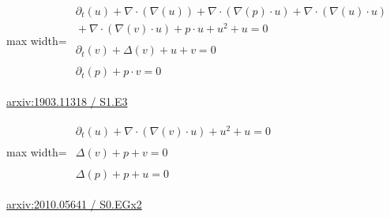 \documentclass[UTF8,10pt,a4paper,fontset=mac]{ctexart}
\begin{document}
\begin{minipage}{\linewidth}\begin{center}\begin{adjustbox}{max width=\linewidth}$\displaystyle\begin{gathered}\begin{gathered}\partial_{t}(u)+\nabla\cdot(\nabla(u))+\nabla\cdot(\nabla(p)\cdot u)+\nabla\cdot(\nabla(u)\cdot u)\\[-1pt]{}+\nabla\cdot(\nabla(v)\cdot u)+p\cdot u+u^{2}+u=0\end{gathered}\\[5pt]\begin{gathered}\partial_{t}(v)+\Delta(v)+u+v=0\end{gathered}\\[5pt]\begin{gathered}\partial_{t}(p)+p\cdot v=0\end{gathered}\end{gathered}$\end{adjustbox}\end{center}{\small\href{https://arxiv.org/html/1903.11318#S1.E3}{arxiv:1903.11318 / S1.E3}}\par\end{minipage}\par\vspace{6mm}

\begin{minipage}{\linewidth}\begin{center}\begin{adjustbox}{max width=\linewidth}$\displaystyle\begin{gathered}\begin{gathered}\partial_{t}(u)+\nabla\cdot(\nabla(v)\cdot u)+u^{2}+u=0\end{gathered}\\[5pt]\begin{gathered}\Delta(v)+p+v=0\end{gathered}\\[5pt]\begin{gathered}\Delta(p)+p+u=0\end{gathered}\end{gathered}$\end{adjustbox}\end{center}{\small\href{https://arxiv.org/html/2010.05641#S0.EGx2}{arxiv:2010.05641 / S0.EGx2}}\par\end{minipage}\par\vspace{6mm}
\end{document}
